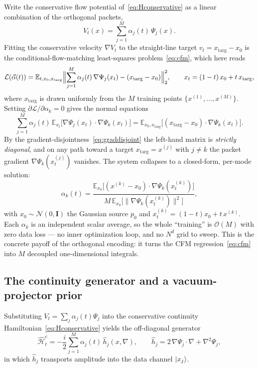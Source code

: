 \documentclass[11pt, a4paper]{article}
\newcommand{\Hgen}{\hat{\mathcal{H}}}
\newcommand{\Eblr}{\mathbb{E}}
\begin{document}
Write the conservative flow potential of~\eqref{eq:Hconservative} as a linear
combination of the orthogonal packets,
\begin{equation}
  V_t(x)=\sum_{j=1}^M\alpha_j(t)\,\Psi_j(x).
\end{equation}
Fitting the conservative velocity $\nabla V_t$ to the straight-line target
$v_t=x_{\mathrm{targ}}-x_0$ is the conditional-flow-matching least-squares
problem~\eqref{eq:cfm}, which here reads
\begin{equation}
  \mathcal{L}(\vec\alpha(t))=
  \Eblr_{t,x_0,x_{\mathrm{targ}}}\Bigl\|
  \sum_{j=1}^M\alpha_j(t)\,\nabla\Psi_j(x_t)-(x_{\mathrm{targ}}-x_0)\Bigr\|_2^2 ,
  \qquad x_t=(1-t)\,x_0+t\,x_{\mathrm{targ}},
\end{equation}
where $x_{\mathrm{targ}}$ is drawn uniformly from the $M$ training points
$\{x^{(1)},\dots,x^{(M)}\}$. Setting $\partial\mathcal{L}/\partial\alpha_k=0$
gives the normal equations
\begin{equation}
  \sum_{j=1}^M\alpha_j(t)\,
  \Eblr_{x_t}\!\bigl[\nabla\Psi_j(x_t)\cdot\nabla\Psi_k(x_t)\bigr]
  =\Eblr_{x_0,x_{\mathrm{targ}}}\!\bigl[(x_{\mathrm{targ}}-x_0)\cdot
  \nabla\Psi_k(x_t)\bigr].
\end{equation}
By the gradient-disjointness~\eqref{eq:graddisjoint} the left-hand matrix is
\emph{strictly diagonal}, and on any path toward a target
$x_{\mathrm{targ}}=x^{(j)}$ with $j\neq k$ the packet gradient
$\nabla\Psi_k(x_t^{(j)})$ vanishes. The system collapses to a closed-form,
per-mode solution:
\begin{equation}
  \alpha_k(t)=\frac{\Eblr_{x_0}\!\bigl[(x^{(k)}-x_0)\cdot
  \nabla\Psi_k(x_t^{(k)})\bigr]}
  {M\,\Eblr_{x_0}\!\bigl[\|\nabla\Psi_k(x_t^{(k)})\|^2\bigr]},
  \label{eq:alpha}
\end{equation}
with $x_0\sim\mathcal{N}(0,\mathbf{I})$ the Gaussian source $p_0$ and
$x_t^{(k)}=(1-t)x_0+t\,x^{(k)}$. Each $\alpha_k$ is an independent scalar
average, so the whole ``training'' is $\mathcal{O}(M)$ with zero data loss ---
no inner optimization loop, and no $N^d$ grid to sweep. This is the concrete
payoff of the orthogonal encoding: it turns the CFM regression~\eqref{eq:cfm}
into $M$ decoupled one-dimensional integrals.

\subsection{The continuity generator and a vacuum-projector prior}

Substituting $V_t=\sum_j\alpha_j(t)\Psi_j$ into the conservative continuity
Hamiltonian~\eqref{eq:Hconservative} yields the off-diagonal generator
\begin{equation}
  \Hgen_t^c=-\frac{i}{2}\sum_{j=1}^M\alpha_j(t)\,\hat h_j(x,\nabla),\qquad
  \hat h_j=2\,\nabla\Psi_j\cdot\nabla+\nabla^2\Psi_j ,
  \label{eq:Hgen_full}
\end{equation}
in which $\hat h_j$ transports amplitude into the data channel $\ket{x_j}$.
\end{document}
